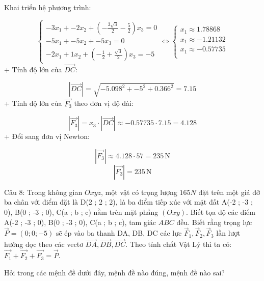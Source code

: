 \documentclass[a4paper,12pt]{article}
\begin{document}
Khai triển hệ phương trình:


\[
\begin{cases}
-3x_1 + -2x_2 + \left(- \frac{3 \sqrt{3}}{2} - \frac{5}{2}\right)x_3 = 0 \\
-5x_1 + -5x_2 + -5x_3 = 0 \\
-2x_1 + 1x_2 + \left(- \frac{1}{2} + \frac{\sqrt{3}}{2}\right)x_3 = -5
\end{cases}
\Leftrightarrow
\begin{cases}
x_1 \approx 1.78868 \\
x_1 \approx -1.21132 \\
x_1 \approx -0.57735 \\
\end{cases}
\]
+ Tính độ lớn của \(\overrightarrow{DC}\):


\[ |\overrightarrow{DC}| = \sqrt{-5.098^2 + -5^2 + 0.366^2} = 7.15 \]
+ Tính độ lớn của \(\overrightarrow{F_3}\) theo đơn vị độ dài:


\[ |\overrightarrow{F_3}| = x_3 \cdot |\overrightarrow{DC}| \approx -0.57735 \cdot 7.15 = 4.128 \]
+ Đổi sang đơn vị Newton:


\[ |\overrightarrow{F_3}| \approx 4.128 \cdot 57 = 235\,\mathrm{N} \]
\[|\overrightarrow{F_3}| = 235\,\mathrm{N}\]



Câu 8: Trong không gian \(Oxyz\), một vật có trọng lượng \(165N\) đặt trên một giá đỡ ba chân với điểm đặt là D(2 ; 2 ; 2), là ba điểm tiếp xúc với mặt đất A(-2 ; -3 ; 0), B(0 ; -3 ; 0), C(a ; b ; c) nằm trên mặt phẳng \((O x y )\). Biết tọa độ các điểm A(-2 ; -3 ; 0), B(0 ; -3 ; 0), C(a ; b ; c), tam giác \(ABC\) đều. Biết rằng trọng lực \(\overrightarrow{P}=(0 ; 0 ; -5)\) sẽ ép vào ba thanh DA, DB, DC các lực \(\overrightarrow{F}_1, \overrightarrow{F}_2, \overrightarrow{F}_3\) lần lượt hướng dọc theo các vectơ \(\overrightarrow{DA}, \overrightarrow{DB}, \overrightarrow{DC}\). Theo tính chất Vật Lý thì ta có: \(\overrightarrow{F_1}+\overrightarrow{F_2}+\overrightarrow{F_3}=\overrightarrow{P}\).

Hỏi trong các mệnh đề dưới đây, mệnh đề nào đúng, mệnh đề nào sai?
\end{document}
